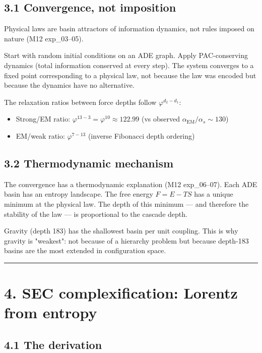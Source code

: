 \documentclass[11pt,a4paper]{article}
\providecommand{\tightlist}{\setlength{\itemsep}{0pt}\setlength{\parskip}{0pt}}
\begin{document}
\subsection*{3.1 Convergence, not imposition}

Physical laws are basin attractors of information dynamics, not rules imposed on nature (M12 exp\_03–05).

Start with random initial conditions on an ADE graph. Apply PAC-conserving dynamics (total information conserved at every step). The system converges to a fixed point corresponding to a physical law, not because the law was encoded but because the dynamics have no alternative.

The relaxation ratios between force depths follow $\varphi^{d_2 - d_1}$:
\begin{itemize}\tightlist
\item Strong/EM ratio: $\varphi^{13-3} = \varphi^{10} \approx 122.99$ (vs observed $\alpha_\text{EM}/\alpha_s \sim 130$)
\item EM/weak ratio: $\varphi^{7-13}$ (inverse Fibonacci depth ordering)
\end{itemize}

\subsection*{3.2 Thermodynamic mechanism}

The convergence has a thermodynamic explanation (M12 exp\_06–07). Each ADE basin has an entropy landscape. The free energy $F = E - TS$ has a unique minimum at the physical law. The depth of this minimum — and therefore the stability of the law — is proportional to the cascade depth.

Gravity (depth 183) has the shallowest basin per unit coupling. This is why gravity is "weakest": not because of a hierarchy problem but because depth-183 basins are the most extended in configuration space.

\begin{center}\rule{0.5\linewidth}{0.4pt}\end{center}

\section*{4. SEC complexification: Lorentz from entropy}

\subsection*{4.1 The derivation}
\end{document}
